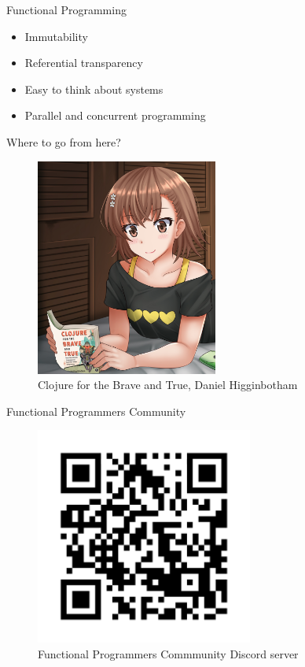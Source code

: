 \documentclass[ignorenonframetext,]{beamer}
\providecommand{\tightlist}{%
  \setlength{\itemsep}{0pt}\setlength{\parskip}{0pt}}
\begin{document}
\begin{frame}{Functional Programming}
\protect\hypertarget{functional-programming}{}

\begin{itemize}
\tightlist
\item
  Immutability
\item
  Referential transparency
\item
  Easy to think about systems
\item
  Parallel and concurrent programming
\end{itemize}

\end{frame}

\begin{frame}{Where to go from here?}
\protect\hypertarget{where-to-go-from-here}{}

\begin{figure}
\centering
\includegraphics[width=\textwidth,height=2.8125in]{Misaka_Mikoto_Clojure_For_The_Brave_And_True.png}
\caption{Clojure for the Brave and True, Daniel Higginbotham}
\end{figure}

\end{frame}

\begin{frame}{Functional Programmers Community}
\protect\hypertarget{functional-programmers-community}{}

\begin{figure}
\centering
\includegraphics[width=\textwidth,height=2.8125in]{functional-programmers-community-discord-server.png}
\caption{Functional Programmers Commmunity Discord server}
\end{figure}

\end{frame}
\end{document}
